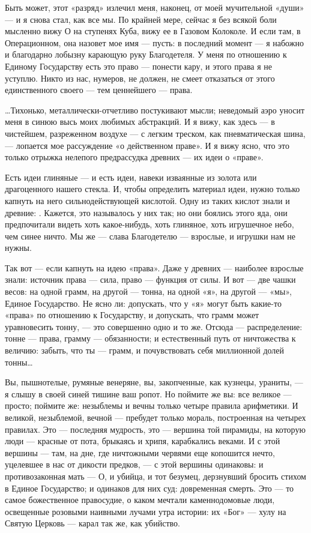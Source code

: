 \documentclass[11pt,openany]{book}
\begin{document}
Быть может, этот «разряд» излечил меня, наконец, от моей мучительной «души» --- и я снова стал, как все мы. По крайней мере, сейчас я без всякой боли мысленно вижу О на ступенях Куба, вижу ее в Газовом Колоколе. И если там, в Операционном, она назовет мое имя --- пусть: в последний момент --- я набожно и благодарно лобызну карающую руку Благодетеля. У меня по отношению к Единому Государству есть это право --- понести кару, и этого права я не уступлю. Никто из нас, нумеров, не должен, не смеет отказаться от этого единственного своего --- тем ценнейшего --- права.

\ldots{}Тихонько, металлически-отчетливо постукивают мысли; неведомый аэро уносит меня в синюю высь моих любимых абстракций. И я вижу, как здесь --- в чистейшем, разреженном воздухе --- с легким треском, как пневматическая шина, --- лопается мое рассуждение «о действенном праве». И я вижу ясно, что это только отрыжка нелепого предрассудка древних --- их идеи о «праве».

Есть идеи глиняные --- и есть идеи, навеки изваянные из золота или драгоценного нашего стекла. И, чтобы определить материал идеи, нужно только капнуть на него сильнодействующей кислотой. Одну из таких кислот знали и древние: . Кажется, это называлось у них так; но они боялись этого яда, они предпочитали видеть хоть какое-нибудь, хоть глиняное, хоть игрушечное небо, чем синее ничто. Мы же --- слава Благодетелю --- взрослые, и игрушки нам не нужны.

Так вот --- если капнуть на идею «права». Даже у древних --- наиболее взрослые знали: источник права --- сила, право --- функция от силы. И вот --- две чашки весов: на одной грамм, на другой --- тонна, на одной «я», на другой --- «мы», Единое Государство. Не ясно ли: допускать, что у «я» могут быть какие-то «права» по отношению к Государству, и допускать, что грамм может уравновесить тонну, --- это совершенно одно и то же. Отсюда --- распределение: тонне --- права, грамму --- обязанности; и естественный путь от ничтожества к величию: забыть, что ты --- грамм, и почувствовать себя миллионной долей тонны\ldots{}

Вы, пышнотелые, румяные венеряне, вы, закопченные, как кузнецы, ураниты, --- я слышу в своей синей тишине ваш ропот. Но поймите же вы: все великое --- просто; поймите же: незыблемы и вечны только четыре правила арифметики. И великой, незыблемой, вечной --- пребудет только мораль, построенная на четырех правилах. Это --- последняя мудрость, это --- вершина той пирамиды, на которую люди --- красные от пота, брыкаясь и хрипя, карабкались веками. И с этой вершины --- там, на дне, где ничтожными червями еще копошится нечто, уцелевшее в нас от дикости предков, --- с этой вершины одинаковы: и противозаконная мать --- О, и убийца, и тот безумец, дерзнувший бросить стихом в Единое Государство; и одинаков для них суд: довременная смерть. Это --- то самое божественное правосудие, о каком мечтали каменнодомовые люди, освещенные розовыми наивными лучами утра истории: их «Бог» --- хулу на Святую Церковь --- карал так же, как убийство.
\end{document}
